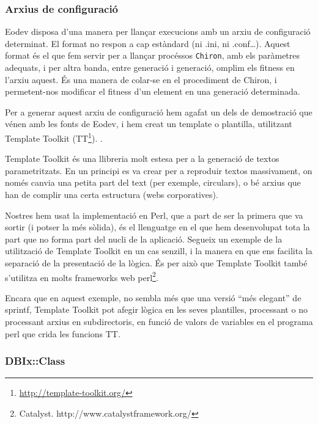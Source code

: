 \subsubsection{Arxius de configuració} %
\label{ssub:Arxius de configuracio}

Eodev disposa d'una manera per llançar execucions amb un arxiu de configuració
determinat.  El format no respon a cap estàndard (ni .ini, ni .conf\ldots).
Aquest format és el que fem servir per a llançar procéssos \texttt{Chiron}, amb
els paràmetres adequats, i per altra banda, entre generació i generació, omplim
els fitness en l'arxiu aquest.  És una manera de colar-se en el procediment de
Chiron, i permetent-nos modificar el fitness d'un element en una generació
determinada.

Per a generar aquest arxiu de configuració hem agafat un dels de demostració que
vénen amb les fonts de Eodev, i hem creat un template o plantilla, utilitzant
Template Toolkit (TT\footnote{\url{http://template-toolkit.org/}}).
\cite{CCW03}.

Template Toolkit és una llibreria molt estesa per a la generació de textos
parametritzats.  En un principi es va crear per a reproduir textos massivament,
on només canvia una petita part del text (per exemple, circulars), o bé arxius
que han de complir una certa estructura (webs corporatives).

Nostres hem usat la implementació en Perl, que a part de ser la primera que va
sortir (i potser la més sòlida), és el llenguatge en el que hem desenvolupat
tota la part que no forma part del nucli de la aplicació.  Segueix un exemple de
la utilització de Template Toolkit en un cas senzill, i la manera en que ens
facilita la separació de la presentació de la lògica.  És per això que Template
Toolkit també s'utilitza en molts frameworks web perl\footnote{Catalyst.
http://www.catalystframework.org/}.

\lstset{language=perl, tabsize=2}
\lstset{commentstyle=\textit}


Encara que en aquest exemple, no sembla més que una versió ``més elegant'' de
sprintf, Template Toolkit pot afegir lògica en les seves plantilles, processant
o no processant arxius en subdirectoris, en funció de valors de variables en el
programa perl que crida les funcions TT.


\subsubsection{DBIx::Class} %
\label{ssub:DBIx Class}

